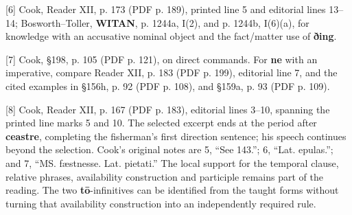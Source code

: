[6] Cook, Reader XII, p. 173 (PDF p. 189), printed line 5 and editorial lines 13–14; Bosworth–Toller, \textbf{WITAN}, p. 1244a, I(2), and p. 1244b, I(6)(a), for knowledge with an accusative nominal object and the fact/\allowbreak{}matter use of \textbf{ðing}.

[7] Cook, §198, p. 105 (PDF p. 121), on direct commands. For \textbf{ne} with an imperative, compare Reader XII, p. 183 (PDF p. 199), editorial line 7, and the cited examples in §156h, p. 92 (PDF p. 108), and §159a, p. 93 (PDF p. 109).

[8] Cook, Reader XII, p. 167 (PDF p. 183), editorial lines 3–10, spanning the printed line marks 5 and 10. The selected excerpt ends at the period after \textbf{ceastre}, completing the fisherman’s first direction sentence; his speech continues beyond the selection. Cook’s original notes are 5, “See 143.”; 6, “Lat. epulas.”; and 7, “MS. fæstnesse. Lat. pietati.” The local support for the temporal clause, relative phrases, availability construction and participle remains part of the reading. The two \textbf{tō}-infinitives can be identified from the taught forms without turning that availability construction into an independently required rule.

\endgroup

\par\label{end-ch06-key}
\clearpage\endgroup
